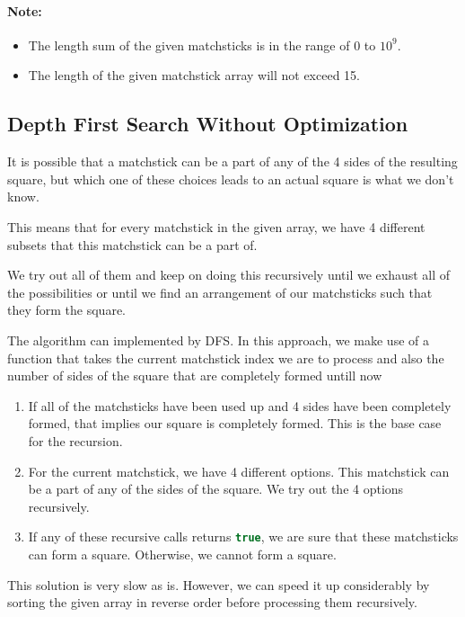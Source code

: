 \paragraph{Note:}
\begin{itemize}
\item The length sum of the given matchsticks is in the range of 0 to $10^9$.
\item The length of the given matchstick array will not exceed 15.
\end{itemize}

\subsection{Depth First Search Without Optimization}
It is possible that a matchstick can be a part of any of the 4 sides of the resulting square, but which one of these choices leads to an actual square is what we don't know.

This means that for every matchstick in the given array, we have 4 different subsets that this matchstick can be a part of.

We try out all of them and keep on doing this recursively until we exhaust all of the possibilities or until we find an arrangement of our matchsticks such that they form the square.

The algorithm can implemented by DFS. In this approach, we make use of a function that takes the current matchstick index we are to process and also the number of sides of the square that are completely formed untill now
\begin{enumerate}
\item If all of the matchsticks have been used up and 4 sides have been completely formed, that implies our square is completely formed. This is the base case for the recursion.
\item For the current matchstick, we have 4 different options. This matchstick can be a part of any of the sides of the square. We try out the 4 options recursively.
\item If any of these recursive calls returns \lstinline[language=C++, basicstyle=\small\ttfamily, keywordstyle=\bfseries\color{green!40!black}]|true|, we are sure that these matchsticks can form a square. Otherwise, we cannot form a square.
\end{enumerate}

This solution is very slow as is. However, we can speed it up considerably by sorting the given array in reverse order before processing them recursively.


